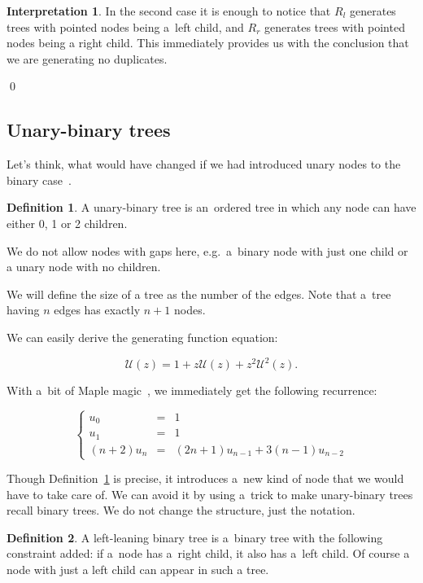\documentclass[final]{article}
\theoremstyle{definition}
\newtheorem{definition}{Definition}[subsection]
\theoremstyle{definition}
\newtheorem{interpretation}{Interpretation}[subsection]
\theoremstyle{remark}
\newcommand{\gf}[1]{\ensuremath{\mathcal{#1}}}
\begin{document}
\begin{interpretation}
In the second case it is enough to notice that \(R_l\) generates trees with pointed nodes being a~left child, and \(R_r\) generates trees with pointed nodes being a right child. This immediately provides us with the conclusion that we are generating no duplicates.

\qed%
\end{interpretation}

\subsection{Unary-binary trees}%
\label{sub:unary_binary_trees}

Let's think, what would have changed if we had introduced unary nodes to the binary case~\cite{motzkin}.

\begin{definition}%
    \label{def:unary_binary_tree}
    A unary-binary tree is an~ordered tree in which any node can have either 0, 1 or 2 children.
\end{definition}

We do not allow nodes with gaps here, e.g.~a~binary node with just one child or a unary node with no children.

We will define the size of a tree as the number of the edges. Note that a~tree having \(n\) edges has exactly \(n + 1\) nodes.

We can easily derive the generating function equation:

\[\gf{U}(z) = 1 + z\gf{U}(z) + z^2 \gf{U}^2(z).\]

With a~bit of Maple magic~\cite{gfun}, we immediately get the following recurrence:

\[\left\{\begin{array}{rcl}
            u_0 &=& 1\\
            u_1 &=& 1\\
            (n + 2)u_{n} &=& (2n + 1)u_{n - 1} + 3(n - 1)u_{n - 2}
\end{array}\right.\]

Though Definition~\ref{def:unary_binary_tree} is precise, it introduces a~new kind of node that we would have to take care of. We can avoid it by using a~trick to make unary-binary trees recall binary trees. We do not change the structure, just the notation.

\begin{definition}%
    \label{def:unary_binary_2}
    A left-leaning binary tree is a~binary tree with the following constraint added: if a~node has a~right child, it also has a~left child. Of course a node with just a left child can appear in such a tree.
\end{definition}
\end{document}
